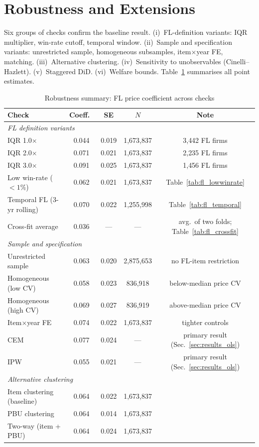 \section{Robustness and Extensions}
\label{sec:robustness}

Six groups of checks confirm the baseline result. (i)~FL-definition
variants: IQR multiplier, win-rate cutoff, temporal window.
(ii)~Sample and specification variants: unrestricted sample,
homogeneous subsamples, item$\times$year FE, matching.
(iii)~Alternative clustering. (iv)~Sensitivity to unobservables
(Cinelli--Hazlett). (v)~Staggered DiD. (vi)~Welfare bounds.
Table~\ref{tab:robustness_summary} summarises all point estimates.

\begin{table}[htbp]
\centering
\caption{Robustness summary: FL price coefficient across checks}
\label{tab:robustness_summary}
\small
\begin{tabular}{lcccc}
\hline\hline
Check & Coeff.\ & SE & $N$ & Note \\
\hline
\multicolumn{5}{l}{\textit{FL definition variants}} \\
IQR 1.0$\times$ & 0.044 & 0.019 & 1{,}673{,}837 & 3{,}442 FL firms \\
IQR 2.0$\times$ & 0.071 & 0.021 & 1{,}673{,}837 & 2{,}235 FL firms \\
IQR 3.0$\times$ & 0.091 & 0.025 & 1{,}673{,}837 & 1{,}456 FL firms \\
Low win-rate ($<1\%$) & 0.062 & 0.021 & 1{,}673{,}837 & Table~\ref{tab:fl_lowwinrate} \\
Temporal FL (3-yr rolling) & 0.070 & 0.022 & 1{,}255{,}998 & Table~\ref{tab:fl_temporal} \\
Cross-fit average & 0.036 & — & — & avg.\ of two folds; Table~\ref{tab:fl_crossfit} \\
\hline
\multicolumn{5}{l}{\textit{Sample and specification}} \\
Unrestricted sample & 0.063 & 0.020 & 2{,}875{,}653 & no FL-item restriction \\
Homogeneous (low CV) & 0.058 & 0.023 & 836{,}918 & below-median price CV \\
Homogeneous (high CV) & 0.069 & 0.027 & 836{,}919 & above-median price CV \\
Item$\times$year FE & 0.074 & 0.022 & 1{,}673{,}837 & tighter controls \\
CEM & 0.077 & 0.024 & — & primary result (Sec.~\ref{sec:results_ols}) \\
IPW & 0.055 & 0.021 & — & primary result (Sec.~\ref{sec:results_ols}) \\
\hline
\multicolumn{5}{l}{\textit{Alternative clustering}} \\
Item clustering (baseline) & 0.064 & 0.022 & 1{,}673{,}837 & \\
PBU clustering & 0.064 & 0.014 & 1{,}673{,}837 & \\
Two-way (item + PBU) & 0.064 & 0.024 & 1{,}673{,}837 & \\
\hline\hline
\end{tabular}
\end{table}

